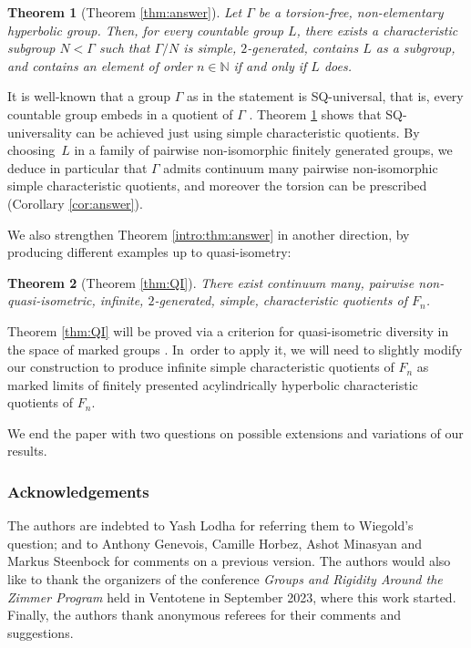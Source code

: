 \documentclass[JEP,XML,SOM,Unicode]{cedram}
\newtheorem{theorem}{Theorem}[section]
\theoremstyle{definition}
\begin{document}
\begin{theorem}[Theorem \ref{thm:answer}]
\label{intro:thm:answer:strong}
Let $\Gamma$ be a torsion-free, non-elementary hyperbolic group. Then, for every countable group $L$, there exists a characteristic subgroup $N < \Gamma$ such that $\Gamma / N$ is simple, $2$-generated, contains $L$ as a subgroup, and contains an element of order $n \in \mathbb{N}$ if and only if $L$ does.
\end{theorem}

It is well-known that a group $\Gamma$ as in the statement is SQ-universal, that is, every countable group embeds in a quotient of $\Gamma$ \cite{SQ1, SQ2}. Theorem \ref{intro:thm:answer:strong} shows that SQ-universality can be achieved just using simple characteristic quotients. By choosing~$L$ in a family of pairwise non-isomorphic finitely generated groups, we deduce in particular that $\Gamma$ admits continuum many pairwise non-isomorphic simple characteristic quotients, and moreover the torsion can be prescribed (Corollary \ref{cor:answer}).

We also strengthen Theorem \ref{intro:thm:answer} in another direction, by producing different examples up to quasi-isometry:

\begin{theorem}[Theorem \ref{thm:QI}]
\label{intro:thm:QI}
There exist continuum many, pairwise non-quasi-isometric, infinite, $2$-generated, simple, characteristic quotients of $F_n$.
\end{theorem}

Theorem \ref{thm:QI} will be proved via a criterion for quasi-isometric diversity in the space of marked groups \cite{diversity}. In~order to apply it, we will need to slightly modify our construction to produce infinite simple characteristic quotients of $F_n$ as marked limits of finitely presented acylindrically hyperbolic characteristic quotients of $F_n$.

We end the paper with two questions on possible extensions and variations of our results.

\subsubsection*{Acknowledgements}
The authors are indebted to Yash Lodha for referring them to Wiegold's question; and to Anthony Genevois, Camille Horbez, Ashot Minasyan and Markus Steenbock for comments on a previous version.
The authors would also like to thank the organizers of the conference \emph{Groups and Rigidity Around the Zimmer Program} held in Ventotene in September 2023, where this work started.
Finally, the authors thank anonymous referees for their comments and suggestions.
\end{document}
